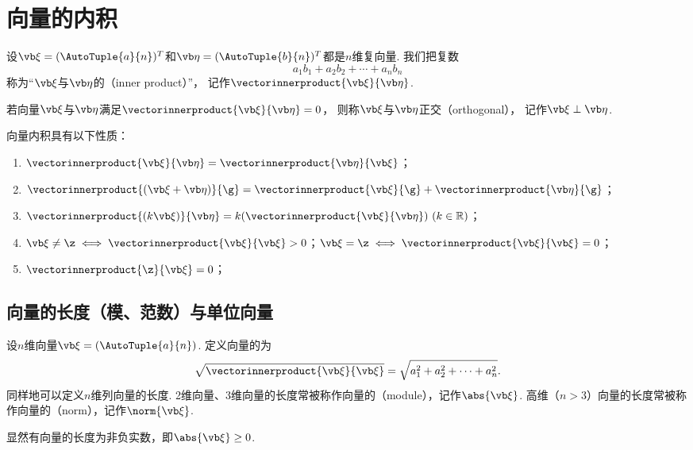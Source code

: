 \section{向量的内积}
\begin{definition}
设\(\a=(\AutoTuple{a}{n})^T\)和\(\b=(\AutoTuple{b}{n})^T\)都是\(n\)维复向量.
我们把复数\[
	a_1b_1 + a_2b_2 + \dotsb + a_nb_n
\]
称为“\(\a\)与\(\b\)的（inner product）”，
记作\(\vectorinnerproduct{\a}{\b}\).
\end{definition}

\begin{definition}
若向量\(\a\)与\(\b\)满足\(\vectorinnerproduct{\a}{\b}=0\)，
则称\(\a\)与\(\b\)正交（orthogonal），
记作\(\a\perp\b\).
\end{definition}

\begin{property}
向量内积具有以下性质：
\begin{enumerate}
	\item \(\vectorinnerproduct{\a}{\b} = \vectorinnerproduct{\b}{\a}\)；
	\item \(\vectorinnerproduct{(\a+\b)}{\g} = \vectorinnerproduct{\a}{\g} + \vectorinnerproduct{\b}{\g}\)；
	\item \(\vectorinnerproduct{(k\a)}{\b} = k (\vectorinnerproduct{\a}{\b})\ (k\in\mathbb{R})\)；
	\item \(\a\neq\z \iff \vectorinnerproduct{\a}{\a} > 0\)；\(\a=\z \iff \vectorinnerproduct{\a}{\a} = 0\)；
	\item \(\vectorinnerproduct{\z}{\a} = 0\)；
\end{enumerate}
\end{property}

\subsection{向量的长度（模、范数）与单位向量}
\begin{definition}
设\(n\)维向量\(\a = (\AutoTuple{a}{n})\).
定义向量的为\[
	\sqrt{\vectorinnerproduct{\a}{\a}} = \sqrt{a_1^2+a_2^2+\dotsb+a_n^2}.
\]同样地可以定义\(n\)维列向量的长度.
2维向量、3维向量的长度常被称作向量的（module），记作\(\abs{\a}\).
高维（\(n > 3\)）向量的长度常被称作向量的（norm），记作\(\norm{\a}\).
\end{definition}

\begin{property}
显然有向量的长度为非负实数，即\(\abs{\a}\geq0\).
\end{property}

